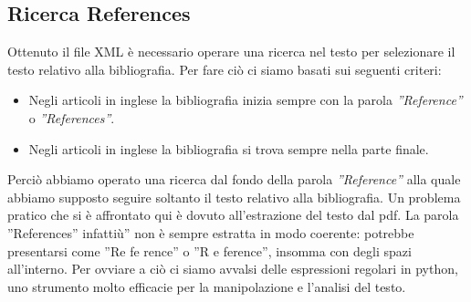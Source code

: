 \subsection{Ricerca References}

Ottenuto il file XML è necessario operare una ricerca nel testo per selezionare il testo relativo alla bibliografia.
Per fare ciò ci siamo basati sui seguenti criteri:
\begin{itemize}
 \item Negli articoli in inglese la bibliografia inizia sempre con la parola \textit{''Reference''} o \textit{''References''}.
 \item Negli articoli in inglese la bibliografia si trova sempre nella parte finale.
\end{itemize}

Perciò abbiamo operato una ricerca dal fondo della parola \textit{''Reference''} alla quale abbiamo supposto seguire soltanto il testo relativo alla bibliografia. 
Un problema pratico che si è affrontato qui è dovuto all'estrazione del testo dal pdf. La parola ''References'' infattiù'' non è sempre estratta in modo coerente: potrebbe presentarsi come ''Re fe rence'' o ''R e ference'', insomma con degli spazi all'interno. Per ovviare a ciò ci siamo avvalsi delle espressioni regolari in python, uno strumento molto efficacie per la manipolazione e l'analisi del testo.


